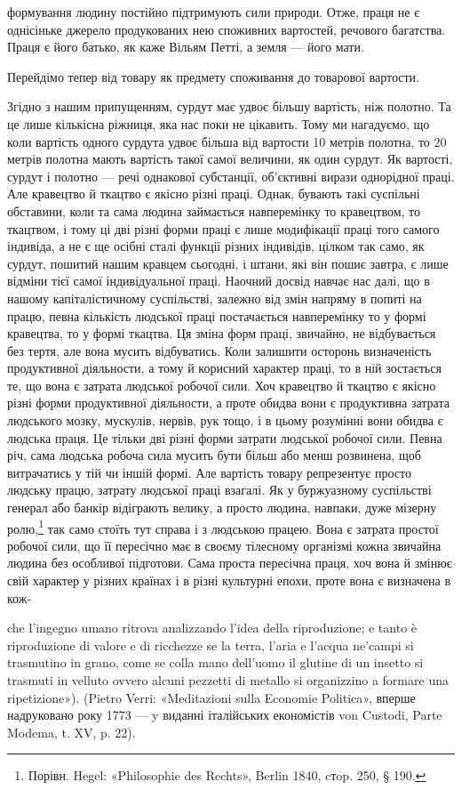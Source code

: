формування людину постійно підтримують сили природи. Отже,
праця не є однісіньке джерело продукованих нею споживних вартостей,
речового багатства. Праця є його батько, як каже Вільям
Петті, а земля — його мати.

Перейдімо тепер від товару як предмету споживання до товарової
вартости.

Згідно з нашим припущенням, сурдут має удвоє більшу вартість,
ніж полотно. Та це лише кількісна ріжниця, яка нас поки
не цікавить. Тому ми нагадуємо, що коли вартість одного
сурдута удвоє більша від вартости 10 метрів полотна, то 20 метрів
полотна мають вартість такої самої величини, як один сурдут. Як
вартості, сурдут і полотно — речі однакової субстанції, об’єктивні
вирази однорідної праці. Але кравецтво й ткацтво є якісно
різні праці. Однак, бувають такі суспільні обставини, коли та
сама людина займається навперемінку то кравецтвом, то ткацтвом,
і тому ці дві різні форми праці є лише модифікації праці
того самого індивіда, а не є ще осібні сталі функції різних індивідів,
цілком так само, як сурдут, пошитий нашим кравцем сьогодні,
і штани, які він пошиє завтра, є лише відміни тієї самої
індивідуальної праці. Наочний досвід навчає нас далі, що в нашому
капіталістичному суспільстві, залежно від змін напряму
в попиті на працю, певна кількість людської праці постачається
навперемінку то у формі кравецтва, то у формі ткацтва. Ця зміна
форм праці, звичайно, не відбувається без тертя, але вона мусить
відбуватись. Коли залишити осторонь визначеність продуктивної
діяльности, а тому й корисний характер праці, то в ній зостається
те, що вона є затрата людської робочої сили. Хоч кравецтво й
ткацтво є якісно різні форми продуктивної діяльности, а проте
обидва вони є продуктивна затрата людського мозку, мускулів,
нервів, рук тощо, і в цьому розумінні вони обидва є людська праця.
Це тільки дві різні форми затрати людської робочої сили. Певна
річ, сама людська робоча сила мусить бути більш або менш розвинена,
щоб витрачатись у тій чи іншій формі. Але вартість товару
репрезентує просто людську працю, затрату людської праці
взагалі. Як у буржуазному суспільстві генерал або банкір відіграють
велику, а просто людина, навпаки, дуже мізерну ролю,\footnote{
Порівн. Hegel: «Philosophie des Rechts», Berlin 1840, cтop. 250,
§ 190.
}
так само стоїть тут справа і з людською працею. Вона є затрата
простої робочої сили, що її пересічно має в своєму тілесному
організмі кожна звичайна людина без особливої підготови. Сама
проста пересічна праця, хоч вона й змінює свій характер у різних
країнах і в різні культурні епохи, проте вона є визначена в кож-

che l’ingegno umano ritrova analizzando l’idea della riproduzione; e tanto
è riproduzione di valore e di ricchezze se la terra, l’aria e l’acqua ne’campi
si trasmutino in grano, come se colla mano dell'uomo il glutine di un insetto
si trasmuti in velluto ovvero alcuni pezzetti di metallo si organizzino a formare
una ripetizione»). (Pietro Verri: «Meditazioni sulla Economie Politica»,
вперше надруковано року 1773 — y виданні італійських економістів
von Custodi, Parte Modema, t. XV, p. 22).
